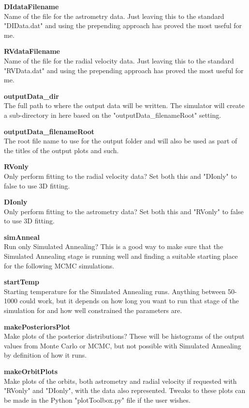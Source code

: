 \documentclass[12pt,preprint]{aastex}
\begin{document}
{\bf DIdataFilename}\\
Name of the file for the astrometry data.  Just leaving this to the standard "DIData.dat" and using the prepending approach has proved the most useful for me.

{\bf RVdataFilename}\\
Name of the file for the radial velocity data.  Just leaving this to the standard "RVData.dat" and using the prepending approach has proved the most useful for me.

{\bf outputData\_dir}\\
The full path to where the output data will be written.  The simulator will create a sub-directory in here based on the "outputData\_filenameRoot" setting.

{\bf outputData\_filenameRoot}\\
The root file name to use for the output folder and will also be used as part of the titles of the output plots and such.

{\bf RVonly}\\
Only perform fitting to the radial velocity data?  Set both this and "DIonly" to false to use 3D fitting.

{\bf DIonly}\\
Only perform fitting to the astrometry data?  Set both this and "RVonly" to false to use 3D fitting.

{\bf simAnneal}\\
Run only Simulated Annealing?  This is a good way to make sure that the Simulated Annealing stage is running well and finding a suitable starting place for the following MCMC simulations.

{\bf startTemp}\\
Starting temperature for the Simulated Annealing runs.  Anything between 50-1000 could work, but it depends on how long you want to run that stage of the simulation for and how well constrained the parameters are.

{\bf makePosteriorsPlot}\\
Make plots of the posterior distributions?  These will be histograms of the output values from Monte Carlo or MCMC, but not possible with Simulated Annealing by definition of how it runs.

{\bf makeOrbitPlots}\\
Make plots of the orbits, both astrometry and radial velocity if requested with "RVonly" and "DIonly", with the data also represented.  Tweaks to these plots can be made in the Python "plotToolbox.py" file if the user wishes.
\end{document}
